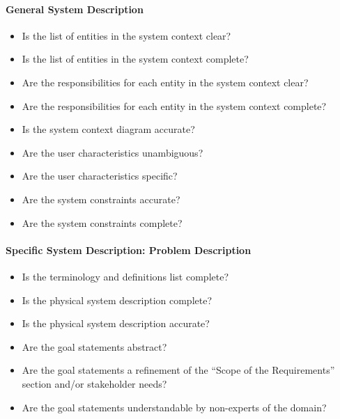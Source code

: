 \paragraph{General System Description}
\begin{itemize}

    \item Is the list of entities in the system context clear?

    \item Is the list of entities in the system context complete?

    \item Are the responsibilities for each entity in the system context clear?

    \item Are the responsibilities for each entity in the system context
    complete?

    \item Is the system context diagram accurate?

    \item Are the user characteristics unambiguous?

    \item Are the user characteristics specific?

    \item Are the system constraints accurate?

    \item Are the system constraints complete?

\end{itemize}

\paragraph{Specific System Description: Problem Description}
\begin{itemize}

    \item Is the terminology and definitions list complete?

    \item Is the physical system description complete?

    \item Is the physical system description accurate?

    \item Are the goal statements abstract?

    \item Are the goal statements a refinement of the ``Scope of the
    Requirements'' section and/or stakeholder needs?

    \item Are the goal statements understandable by non-experts of the domain?

\end{itemize}


